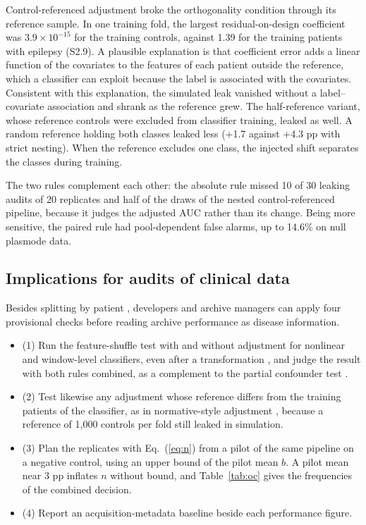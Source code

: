 \documentclass[final,1p,times]{elsarticle}
\newcommand{\tabref}[1]{Table~\ref{#1}}
\renewcommand{\eqref}[1]{Eq.~(\ref{#1})}
\begin{document}
Control-referenced adjustment broke the orthogonality condition through its reference sample. In one training fold, the largest residual-on-design coefficient was $3.9\times10^{-15}$ for the training controls, against 1.39 for the training patients with epilepsy (S2.9). A plausible explanation is that coefficient error adds a linear function of the covariates to the features of each patient outside the reference, which a classifier can exploit because the label is associated with the covariates. Consistent with this explanation, the simulated leak vanished without a label--covariate association and shrank as the reference grew. The half-reference variant, whose reference controls were excluded from classifier training, leaked as well. A random reference holding both classes leaked less (+1.7 against +4.3 pp with strict nesting). When the reference excludes one class, the injected shift separates the classes during training.

The two rules complement each other: the absolute rule missed 10 of 30 leaking audits of 20 replicates and half of the draws of the nested control-referenced pipeline, because it judges the adjusted AUC rather than its change. Being more sensitive, the paired rule had pool-dependent false alarms, up to 14.6\% on null plasmode data.

\subsection{Implications for audits of clinical data}\label{sec:implikasi}

Besides splitting by patient \cite{delpup2025,brookshire2024,rosenblatt2024}, developers and archive managers can apply four provisional checks before reading archive performance as disease information.
\begin{itemize}[leftmargin=*,itemsep=0pt,topsep=2pt]
\item (1) Run the feature-shuffle test with and without adjustment for nonlinear and window-level classifiers, even after a transformation \cite{hamdan2023}, and judge the result with both rules combined, as a complement to the partial confounder test \cite{spisak2022}.
\item (2) Test likewise any adjustment whose reference differs from the training patients of the classifier, as in normative-style adjustment \cite{rutherford2022,kia2022}, because a reference of 1,000 controls per fold still leaked in simulation.
\item (3) Plan the replicates with \eqref{eq:n} from a pilot of the same pipeline on a negative control, using an upper bound of the pilot mean $b$. A pilot mean near 3 pp inflates $n$ without bound, and \tabref{tab:oc} gives the frequencies of the combined decision.
\item (4) Report an acquisition-metadata baseline beside each performance figure.
\end{itemize}
\end{document}
